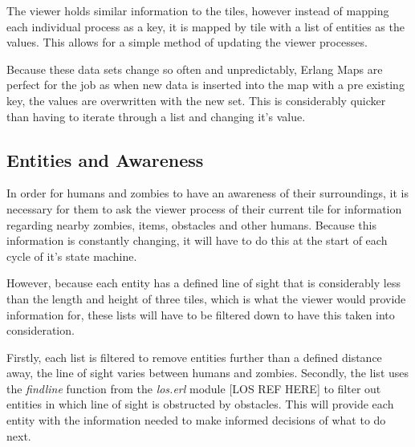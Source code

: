The viewer holds similar information to the tiles, however instead of mapping each individual process as a key, it is mapped by tile with a list of entities as the values. This allows for a simple method of updating the viewer processes.

Because these data sets change so often and unpredictably, Erlang Maps are perfect for the job as when new data is inserted into the map with a pre existing key, the values are overwritten with the new set. This is considerably quicker than having to iterate through a list and changing it's value.

\subsection{Entities and Awareness}
\label{viewer_intro}
In order for humans and zombies to have an awareness of their surroundings, it is necessary for them to ask the viewer process of their current tile for information regarding nearby zombies, items, obstacles and other humans. Because this information is constantly changing, it will have to do this at the start of each cycle of it's state machine.

However, because each entity has a defined line of sight that is considerably less than the length and height of three tiles, which is what the viewer would provide information for, these lists will have to be filtered down to have this taken into consideration.

Firstly, each list is filtered to remove entities further than a defined distance away, the line of sight varies between humans and zombies. Secondly, the list uses the \emph{findline} function from the \emph{los.erl} module [LOS REF HERE] to filter out entities in which line of sight is obstructed by obstacles. This will provide each entity with the information needed to make informed decisions of what to do next.

